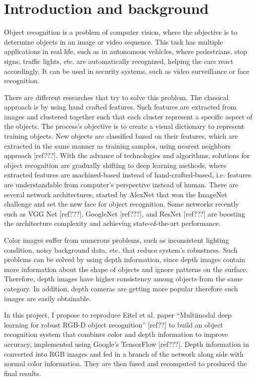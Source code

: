 \section{Introduction and background}\label{sec:intro}
Object recognition is a problem of computer vision, where the objective is to determine objects in an image or video sequence. This task has multiple applications in real life, such as in autonomous vehicles, where pedestrians, stop signs, traffic lights, etc. are automatically recognized, helping the cars react accordingly. It can be used in security systems, such as video surveillance or face recognition.

There are different researches that try to solve this problem. The classical approach is by using hand crafted features. Such features are extracted from images and clustered together such that each cluster represent a specific aspect of the objects. The process's objective is to create a visual dictionary to represent training objects. New objects are classified based on their features, which are extracted in the same manner as training samples, using nearest neighbors approach [ref???]. With the advance of technologies and algorithms, solutions for object recognition are gradually shifting to deep learning methods, where extracted features are machined-based instead of hand-crafted-based, i.e. features are understandable from computer's perspective instead of human. There are several network architectures, started by AlexNet that won the ImageNet challenge and set the new face for object recognition. Some networks recently such as VGG Net [ref???], GoogleNet [ref???], and ResNet [ref???] are boosting the architecture complexity and achieving state-of-the-art performance.

Color images suffer from numerous problems, such as inconsistent lighting condition, noisy background data, etc. that reduce system's robustness. Such problems can be solved by using depth information, since depth images contain more information about the shape of objects and ignore patterns on the surface. Therefore, depth images have higher consistency among objects from the same category. In addition, depth cameras are getting more popular therefore such images are easily obtainable.

In this project, I propose to reproduce Eitel et al. paper ``Multimodal deep learning for robust RGB-D object recognition'' [ref??] to build an object recognition system that combines color and depth information to improve accuracy, implemented using Google's TensorFlow [ref???]. Depth information in converted into RGB images and fed in a branch of the network along side with normal color information. They are then fused and recomputed to produced the final results.